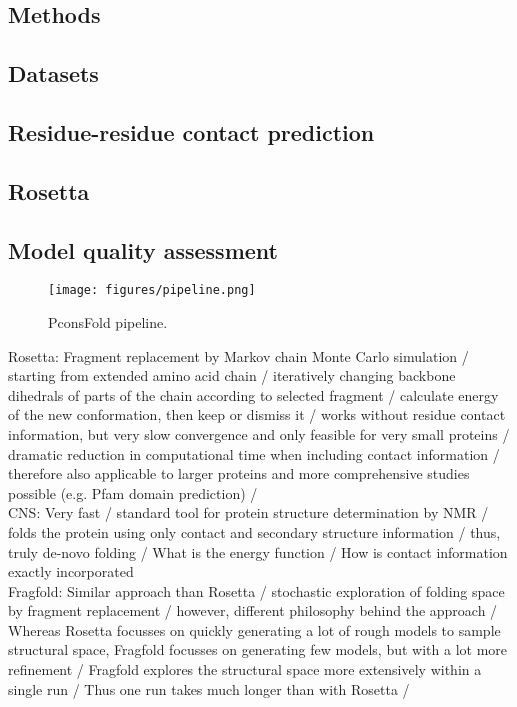 \documentclass{bioinfo}
\begin{document}
\begin{methods}
\section{Methods}
\subsection{Datasets}

\subsection{Residue-residue contact prediction}
\subsection{Rosetta}
\subsection{Model quality assessment}

\begin{figure}[!tpb]%
    \centerline{\texttt{[image: figures/pipeline.png]}}
\caption{PconsFold pipeline.}\label{fig:main}
\end{figure}
Rosetta: Fragment replacement by Markov chain Monte Carlo simulation / starting from extended amino acid chain / iteratively changing backbone dihedrals of parts of the chain according to selected fragment / calculate energy of the new conformation, then keep or dismiss it / works without residue contact information, but very slow convergence and only feasible for very small proteins / dramatic reduction in computational time when including contact information / therefore also applicable to larger proteins and more comprehensive studies possible (e.g. Pfam domain prediction) / \\
CNS: Very fast / standard tool for protein structure determination by NMR / folds the protein using only contact and secondary structure information / thus, truly de-novo folding / What is the energy function / How is contact information exactly incorporated \\
Fragfold: Similar approach than Rosetta / stochastic exploration of folding space by fragment replacement / however, different philosophy behind the approach / Whereas Rosetta focusses on quickly generating a lot of rough models to sample structural space, Fragfold focusses on generating few models, but with a lot more refinement / Fragfold explores the structural space more extensively within a single run / Thus one run takes much longer than with Rosetta / 


\end{methods}
\end{document}
